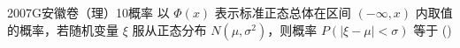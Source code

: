 
\begin{problem}{2007}{G}{安徽卷（理）}{10}{概率}
以 $\Phi(x)$ 表示标准正态总体在区间 $(-\infty,x)$ 内取值的概率，若随机变量 $\xi$ 服从正态分布 $N(\mu,\sigma^2)$，则概率 $P(|\xi-\mu|<\sigma)$ 等于 (\hspace{1cm})
\begin{choices}
\choice{{$\Phi(\mu+\sigma)-\Phi(\mu-\sigma)$}}
\choice{{$2\Phi(\mu+\sigma)$}}
\end{choices}
\end{problem}

\begin{answer}

\end{answer}

\begin{solutions}

\end{solutions}
